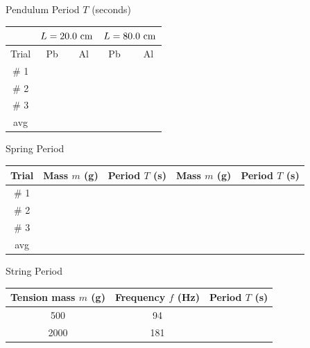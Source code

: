 \documentclass[11pt]{NSF}
\begin{document}
\begin{table}[hbtp]
\begin{center}
Pendulum Period $T$ (seconds)\\
\begin{tabular}{| c | c | c | c | c | }
\hline
&\multicolumn{2}{c}{$L=20.0~{\rm cm}$} \vrule
&\multicolumn{2}{c}{$L=80.0~{\rm cm}$} \vrule\\
\hline
Trial & \phantom{ }Pb\phantom{ } & Al & \phantom{ }Pb\phantom{ }\  & Al \\
\hline
\# 1 &  &  &  &  \\
\hline
\# 2 &  &  &  &  \\
\hline
\# 3 &  &  &  &  \\
\hline
avg  &  &  &  &  \\
\hline
\end{tabular}
\label{t:1}
\end{center}
\end{table}

%
\begin{table}[hbtp]
\begin{center}
Spring Period\\
\begin{tabular}{| c | c | c | c | c | }
\hline
Trial & Mass $m$ (g) & Period $T$ (s) & Mass $m$ (g) & Period $T$ (s) \\
\hline
\# 1 &  &  &  &  \\
\hline
\# 2 &  &  &  &  \\
\hline
\# 3 &  &  &  &  \\
\hline
avg  &  &  &  &  \\
\hline
\end{tabular}
\label{t:1}
\end{center}
\end{table}
%

%
\begin{table}[hbtp]
\begin{center}
String Period\\
\begin{tabular}{| c | c | c | }
\hline
Tension mass $m$ (g) & Frequency $f$ (Hz) & Period $T$ (s) \\
\hline
500 & 94 & \\
\hline
2000 & 181 & \\
\hline
\end{tabular}
\label{t:1}
\end{center}
\end{table}
%
\end{document}
